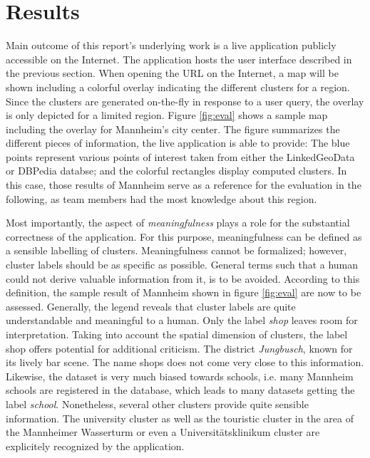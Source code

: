 \section{Results}

Main outcome of this report's underlying work is a live application publicly accessible on the Internet. The application hosts the user interface described in the previous section. When opening the URL on the Internet, a map will be shown including a colorful overlay indicating the different clusters for a region. Since the clusters are generated on-the-fly in response to a user query, the overlay is only depicted for a limited region. Figure \ref{fig:eval} shows a sample map including the overlay for Mannheim's city center. The figure summarizes the different pieces of information, the live application is able to provide: The blue points represent various points of interest taken from either the LinkedGeoData or DBPedia databse; and the colorful rectangles display computed clusters. In this case, those results of Mannheim serve as a reference for the evaluation in the following, as team members had the most knowledge about this region. 

Most importantly, the aspect of \textit{meaningfulness} plays a role for the substantial correctness of the application. For this purpose, meaningfulness can be defined as a sensible labelling of clusters. Meaningfulness cannot be formalized; however, cluster labels should be as specific as possible. General terms such that a human could not derive valuable information from it, is to be avoided. According to this definition, the sample result of Mannheim shown in figure \ref{fig:eval} are now to be assessed. Generally, the legend reveals that cluster labels are quite understandable and meaningful to a human. Only the label \textit{shop} leaves room for interpretation. Taking into account the spatial dimension of clusters, the label shop offers potential for  additional criticism. The district \textit{Jungbusch}, known for its lively bar scene. The name shops does not come very close to this information. Likewise, the dataset is very much biased towards schools, i.e. many Mannheim schools are registered in the database, which leads to many datasets getting the label \textit{school}.  Nonetheless, several other clusters provide quite sensible information. The university cluster as well as the touristic cluster in the area of the Mannheimer Wasserturm or even a Universitätsklinikum cluster are  explicitely recognized by the application.

